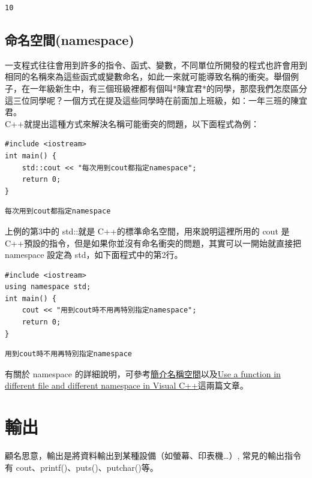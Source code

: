 \documentclass[a4paper,12pt]{article}
\begin{document}
\begin{verbatim}
10
\end{verbatim}
\subsection{命名空間(namespace)}
\label{sec:org30585a1}
一支程式往往會用到許多的指令、函式、變數，不同單位所開發的程式也許會用到相同的名稱來為這些函式或變數命名，如此一來就可能導致名稱的衝突。舉個例子，在一年級新生中，有三個班級裡都有個叫*陳宜君*的同學，那麼我們怎麼區分這三位同學呢？一個方式在提及這些同學時在前面加上班級，如：一年三班的陳宜君。\\

C++就提出這種方式來解決名稱可能衝突的問題，以下面程式為例：\\
\lstset{breaklines=true,language=cpp,label= ,caption= ,captionpos=b,firstnumber=1,numbers=left}
\begin{lstlisting}
#include <iostream>
int main() {
    std::cout << "每次用到cout都指定namespace";
    return 0;
}
\end{lstlisting}

\begin{verbatim}
每次用到cout都指定namespace
\end{verbatim}


上例的第3中的 std::就是 C++的標準命名空間，用來說明這裡所用的 cout 是 C++預設的指令，但是如果你並沒有命名衝突的問題，其實可以一開始就直接把 namespace 設定為 std，如下面程式中的第2行。\\
\lstset{breaklines=true,language=cpp,label= ,caption= ,captionpos=b,firstnumber=1,numbers=left}
\begin{lstlisting}
#include <iostream>
using namespace std;
int main() {
    cout << "用到cout時不用再特別指定namespace";
    return 0;
}
\end{lstlisting}

\begin{verbatim}
用到cout時不用再特別指定namespace
\end{verbatim}


有關於 namespace 的詳細說明，可參考\href{https://openhome.cc/Gossip/CppGossip/Namespace.html}{簡介名稱空間}以及\href{https://stackoverflow.com/questions/37693999/use-a-function-in-different-file-and-different-namespace-in-visual-c}{Use a function in different file and different namespace in Visual C++}這兩篇文章。\\
\newpage

\section{輸出}
\label{cpp_output}
顧名思意，輸出是將資料輸出到某種設備（如螢幕、印表機\ldots{}）, 常見的輸出指令有 cout、printf()、puts()、putchar()等。\\
\end{document}
